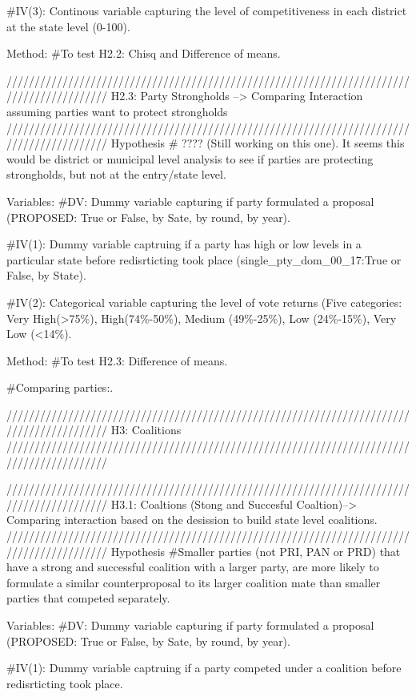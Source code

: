 \documentclass[]{article}
\begin{document}
\#IV(3): Continous variable capturing the level of competitiveness in
each district at the state level (0-100).

Method: \#To test H2.2: Chisq and Difference of means.

//////////////////////////////////////////////////////////////////////////////////////////
H2.3: Party Strongholds --\textgreater{} Comparing Interaction assuming
parties want to protect strongholds
//////////////////////////////////////////////////////////////////////////////////////////
Hypothesis \# ???? (Still working on this one). It seems this would be
district or municipal level analysis to see if parties are protecting
strongholds, but not at the entry/state level.

Variables: \#DV: Dummy variable capturing if party formulated a proposal
(PROPOSED: True or False, by Sate, by round, by year).

\#IV(1): Dummy variable captruing if a party has high or low levels in a
particular state before redisrticting took place
(single\_pty\_dom\_00\_17:True or False, by State).

\#IV(2): Categorical variable capturing the level of vote returns (Five
categories: Very High(\textgreater{}75\%), High(74\%-50\%), Medium
(49\%-25\%), Low (24\%-15\%), Very Low (\textless{}14\%).

Method: \#To test H2.3: Difference of means.

\#Comparing parties:.

//////////////////////////////////////////////////////////////////////////////////////////
H3: Coalitions
//////////////////////////////////////////////////////////////////////////////////////////

//////////////////////////////////////////////////////////////////////////////////////////
H3.1: Coaltions (Stong and Succesful Coaltion)--\textgreater{} Comparing
interaction based on the desission to build state level coalitions.\\
//////////////////////////////////////////////////////////////////////////////////////////
Hypothesis \#Smaller parties (not PRI, PAN or PRD) that have a strong
and successful coalition with a larger party, are more likely to
formulate a similar counterproposal to its larger coalition mate than
smaller parties that competed separately.

Variables: \#DV: Dummy variable capturing if party formulated a proposal
(PROPOSED: True or False, by Sate, by round, by year).

\#IV(1): Dummy variable captruing if a party competed under a coalition
before redisrticting took place.
\end{document}
